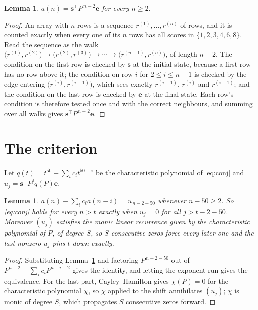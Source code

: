\documentclass[11pt,a4paper]{article}
\theoremstyle{plain}
\newtheorem{lemma}[theorem]{Lemma}
\theoremstyle{definition}
\begin{document}
\begin{lemma}\label{lem:walk}
$a(n)=\mathbf{s}^{\!\top}P^{\,n-2}\mathbf{e}$ for every $n\ge2$.
\end{lemma}

\begin{proof}
An array with $n$ rows is a sequence $r^{(1)},\dots,r^{(n)}$ of rows, and it is counted
exactly when every one of its $n$ rows has all scores in $\{1,2,3,4,6,8\}$. Read the sequence as the
walk $\bigl(r^{(1)},r^{(2)}\bigr)\to\bigl(r^{(2)},r^{(3)}\bigr)\to\cdots\to
\bigl(r^{(n-1)},r^{(n)}\bigr)$, of length $n-2$. The condition on the first row is
checked by $\mathbf{s}$ at the initial state, because a first row has no row above it; the
condition on row $i$ for $2\le i\le n-1$ is checked by the edge entering
$\bigl(r^{(i)},r^{(i+1)}\bigr)$, which sees exactly $r^{(i-1)}$, $r^{(i)}$ and
$r^{(i+1)}$; and the condition on the last row is checked by $\mathbf{e}$ at the final
state. Each row's condition is therefore tested once and with the correct neighbours, and
summing over all walks gives $\mathbf{s}^{\!\top}P^{\,n-2}\mathbf{e}$.
\end{proof}

\section{The criterion}

Let $q(t)=t^{50}-\sum_i c_i t^{50-i}$ be the characteristic polynomial of
\eqref{eq:conj} and $u_j=\mathbf{s}^{\!\top}P^{j}q(P)\mathbf{e}$.

\begin{lemma}\label{lem:crit}
$a(n)-\sum_i c_i a(n-i)=u_{\,n-2-50}$ whenever $n-50\ge2$. So \eqref{eq:conj}
holds for every $n>t$ exactly when $u_j=0$ for all $j>t-2-50$. Moreover $(u_j)$
satisfies the monic linear recurrence given by the characteristic polynomial of $P$, of
degree $S$, so $S$ consecutive zeros force every later one and the last nonzero $u_j$ pins
$t$ down exactly.
\end{lemma}

\begin{proof}
Substituting Lemma~\ref{lem:walk} and factoring $P^{\,n-2-50}$ out of
$P^{n-2}-\sum_i c_i P^{n-i-2}$ gives the identity, and letting the exponent run gives the
equivalence. For the last part, Cayley--Hamilton gives $\chi(P)=0$ for the characteristic
polynomial $\chi$, so $\chi$ applied to the shift annihilates $(u_j)$; $\chi$ is monic of
degree $S$, which propagates $S$ consecutive zeros forward.
\end{proof}
\end{document}

